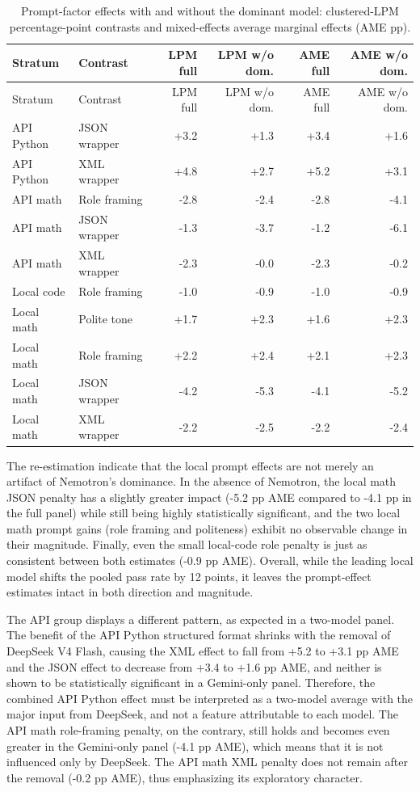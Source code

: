 \documentclass{llncs}
\begin{document}
\begin{longtable}[]{@{}llrrrr@{}}
\caption{Prompt-factor effects with and without the dominant model: clustered-LPM percentage-point contrasts and mixed-effects average marginal effects (AME pp).}\label{tab:dominant-effects}\tabularnewline
\toprule\noalign{}
Stratum & Contrast & LPM full & LPM w/o dom. & AME full & AME w/o dom. \\
\midrule\noalign{}
\endfirsthead
\toprule\noalign{}
Stratum & Contrast & LPM full & LPM w/o dom. & AME full & AME w/o dom. \\
\midrule\noalign{}
\endhead
\bottomrule\noalign{}
\endlastfoot
API Python & JSON wrapper & +3.2 & +1.3 & +3.4 & +1.6 \\
API Python & XML wrapper & +4.8 & +2.7 & +5.2 & +3.1 \\
API math & Role framing & -2.8 & -2.4 & -2.8 & -4.1 \\
API math & JSON wrapper & -1.3 & -3.7 & -1.2 & -6.1 \\
API math & XML wrapper & -2.3 & -0.0 & -2.3 & -0.2 \\
Local code & Role framing & -1.0 & -0.9 & -1.0 & -0.9 \\
Local math & Polite tone & +1.7 & +2.3 & +1.6 & +2.3 \\
Local math & Role framing & +2.2 & +2.4 & +2.1 & +2.3 \\
Local math & JSON wrapper & -4.2 & -5.3 & -4.1 & -5.2 \\
Local math & XML wrapper & -2.2 & -2.5 & -2.2 & -2.4 \\
\end{longtable}

The re-estimation indicate that the local prompt effects are not merely an artifact of Nemotron's dominance. In the absence of Nemotron, the local math JSON penalty has a slightly greater impact (-5.2 pp AME compared to -4.1 pp in the full panel) while still being highly statistically significant, and the two local math prompt gains (role framing and politeness) exhibit no observable change in their magnitude. Finally, even the small local-code role penalty is just as consistent between both estimates (-0.9 pp AME). Overall, while the leading local model shifts the pooled pass rate by 12 points, it leaves the prompt-effect estimates intact in both direction and magnitude.

The API group displays a different pattern, as expected in a two-model panel. The benefit of the API Python structured format shrinks with the removal of DeepSeek V4 Flash, causing the XML effect to fall from +5.2 to +3.1 pp AME and the JSON effect to decrease from +3.4 to +1.6 pp AME, and neither is shown to be statistically significant in a Gemini-only panel. Therefore, the combined API Python effect must be interpreted as a two-model average with the major input from DeepSeek, and not a feature attributable to each model. The API math role-framing penalty, on the contrary, still holds and becomes even greater in the Gemini-only panel (-4.1 pp AME), which means that it is not influenced only by DeepSeek. The API math XML penalty does not remain after the removal (-0.2 pp AME), thus emphasizing its exploratory character.
\end{document}
